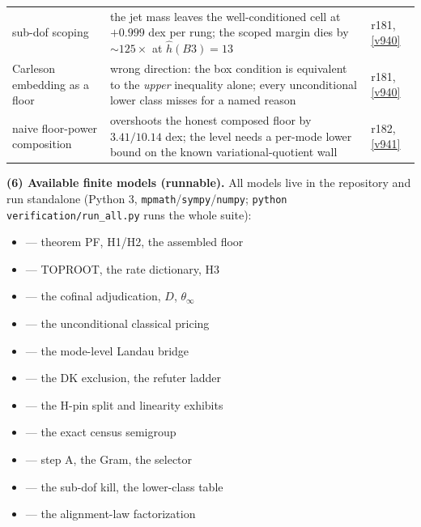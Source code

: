 \documentclass[11pt,a4paper]{article}
\begin{document}
\begin{center}
\begin{tabularx}{\linewidth}{@{}>{\hsize=0.62\hsize\raggedright\arraybackslash}X>{\hsize=1.08\hsize\raggedright\arraybackslash}X>{\hsize=0.30\hsize\raggedright\arraybackslash}X@{}}
sub-dof scoping & the jet mass leaves the well-conditioned cell at $+0.999$ dex per rung; the scoped margin dies by ${\sim}125\times$ at $\hat h(B3) = 13$ & r181, \vref{v940} \\
Carleson embedding as a floor & wrong direction: the box condition is equivalent to the \emph{upper} inequality alone; every unconditional lower class misses for a named reason & r181, \vref{v940} \\
naive floor-power composition & overshoots the honest composed floor by $3.41/10.14$ dex; the level needs a per-mode lower bound on the known variational-quotient wall & r182, \vref{v941} \\
\bottomrule
\end{tabularx}
\end{center}

\par\smallskip\noindent\textbf{(6) Available finite models (runnable).}  All models live in
the repository and run standalone (Python 3, \texttt{mpmath}/\texttt{sympy}/\texttt{numpy};
\texttt{python verification/run\_all.py} runs the whole suite):
\begin{itemize}
\item {} --- theorem PF, H1/H2, the assembled floor
\item {} --- TOPROOT, the rate dictionary, H3
\item {} --- the cofinal adjudication, $D$, $\theta_\infty$
\item {} --- the unconditional classical pricing
\item {} --- the mode-level Landau bridge
\item {} --- the DK exclusion, the refuter ladder
\item {} --- the H-pin split and linearity exhibits
\item {} --- the exact census semigroup
\item {} --- step A, the Gram, the selector
\item {} --- the sub-dof kill, the lower-class table
\item {} --- the alignment-law factorization
\end{itemize}
\end{document}
